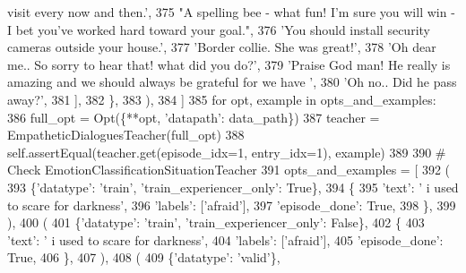 \begin{DoxyCode}
{       visit every now and then.'},
375                             \textcolor{stringliteral}{"A spelling bee - what fun! I'm sure you will win - I bet you've worked hard
       toward your goal."},
376                             \textcolor{stringliteral}{'You should install security cameras outside your house.'},
377                             \textcolor{stringliteral}{'Border collie. She was great!'},
378                             \textcolor{stringliteral}{'Oh dear me.. So sorry to hear that! what did you do?'},
379                             \textcolor{stringliteral}{'Praise God man! He really is amazing and we should always be grateful for we
       have '},
380                             \textcolor{stringliteral}{'Oh no.. Did he pass away?'},
381                         ],
382                     \},
383                 ),
384             ]
385             \textcolor{keywordflow}{for} opt, example \textcolor{keywordflow}{in} opts\_and\_examples:
386                 full\_opt = Opt(\{**opt, \textcolor{stringliteral}{'datapath'}: data\_path\})
387                 teacher = EmpatheticDialoguesTeacher(full\_opt)
388                 self.assertEqual(teacher.get(episode\_idx=1, entry\_idx=1), example)
389 
390             \textcolor{comment}{# Check EmotionClassificationSituationTeacher}
391             opts\_and\_examples = [
392                 (
393                     \{\textcolor{stringliteral}{'datatype'}: \textcolor{stringliteral}{'train'}, \textcolor{stringliteral}{'train\_experiencer\_only'}: \textcolor{keyword}{True}\},
394                     \{
395                         \textcolor{stringliteral}{'text'}: \textcolor{stringliteral}{' i used to scare for darkness'},
396                         \textcolor{stringliteral}{'labels'}: [\textcolor{stringliteral}{'afraid'}],
397                         \textcolor{stringliteral}{'episode\_done'}: \textcolor{keyword}{True},
398                     \},
399                 ),
400                 (
401                     \{\textcolor{stringliteral}{'datatype'}: \textcolor{stringliteral}{'train'}, \textcolor{stringliteral}{'train\_experiencer\_only'}: \textcolor{keyword}{False}\},
402                     \{
403                         \textcolor{stringliteral}{'text'}: \textcolor{stringliteral}{' i used to scare for darkness'},
404                         \textcolor{stringliteral}{'labels'}: [\textcolor{stringliteral}{'afraid'}],
405                         \textcolor{stringliteral}{'episode\_done'}: \textcolor{keyword}{True},
406                     \},
407                 ),
408                 (
409                     \{\textcolor{stringliteral}{'datatype'}: \textcolor{stringliteral}{'valid'}\},

\end{DoxyCode}

